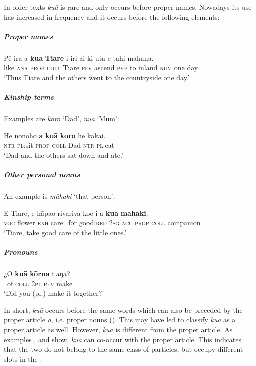 In older texts \textit{kuā} is rare and only occurs before proper names. Nowadays its use has increased in frequency and it occurs before the following elements:

\subparagraph{Proper names}

\ea\label{ex:5.8}
\gll Pē ira a \textbf{kuā} \textbf{Tiare} i iri ai ki {\ꞌ}uta e tahi mahana. \\
like \textsc{ana} \textsc{prop} \textsc{coll} Tiare \textsc{pfv} ascend \textsc{pvp} to inland \textsc{num} one day \\

\glt
‘Thus Tiare and the others went to the countryside one day.’ \textstyleExampleref{[R151.048]} 
\z

\subparagraph{Kinship terms} Examples are \textit{koro} ‘Dad’, \textit{nua} ‘Mum’:

\ea\label{ex:5.9}
\gll He nonoho \textbf{a} \textbf{kuā} \textbf{koro} he kakai. \\
\textsc{ntr} \textsc{pl}:sit \textsc{prop} \textsc{coll} Dad \textsc{ntr} \textsc{pl}:eat \\

\glt
‘Dad and the others sat down and ate.’ \textstyleExampleref{[R333.538]} 
\z

\subparagraph{Other personal nouns} An example is \textit{māhaki} ‘that person’:

\ea\label{ex:5.10}
\gll E Tiare, e hāpa{\ꞌ}o rivariva koe i a \textbf{kuā} \textbf{māhaki}. \\
\textsc{voc} flower \textsc{exh} care\_for good:\textsc{red} \textsc{2sg} \textsc{acc} \textsc{prop} \textsc{coll} companion \\

\glt
‘Tiare, take good care of the little ones.’ \textstyleExampleref{[R496.015]} 
\z

\subparagraph{Pronouns}

\ea\label{ex:5.11}
\gll ¿O \textbf{kuā} \textbf{kōrua} i aŋa? \\
~of \textsc{coll} \textsc{2pl} \textsc{pfv} make \\

\glt
‘Did you (pl.) make it together?’ \textstyleExampleref{[R415.808]} 
\z

In short, \textit{kuā} occurs before the same words which can also be preceded by the proper article \textit{a}, i.e. proper nouns (). This may have led \citet[474]{DuFeu1987} to classify \textit{kuā} as a proper article as well. However, \textit{kuā} is different from the proper article. As examples ,  and  show, \textit{kuā} can co-occur with the proper article. This indicates that the two do not belong to the same class of particles, but occupy different slots in the .

